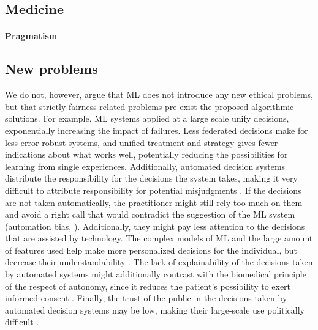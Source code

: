 \subsection{Medicine}

    \paragraph{Pragmatism}


\subsection{New problems}
    We do not, however, argue that ML does not introduce any new ethical problems, but that strictly fairness-related problems pre-exist the proposed algorithmic solutions.
    For example, ML systems applied at a large scale unify decisions, exponentially increasing the impact of failures.
    Less federated decisions make for less error-robust systems, and unified treatment and strategy gives fewer indications about what works well, potentially reducing the possibilities for learning from single experiences.
    Additionally, automated decision systems distribute the responsibility for the decisions the system takes, making it very difficult to attribute responsibility for potential misjudgments \cite[p.~6]{Morley2020}.
    If the decisions are not taken automatically, the practitioner might still rely too much on them and avoid a right call that would contradict the suggestion of the ML system \cite[p.~4]{Morley2020} (automation bias, \cite[p.~4]{Rajkomar2018}).
    Additionally, they might pay less attention to the decisions that are assisted by technology.
    The complex models of ML and the large amount of features used help make more personalized decisions for the individual, but decrease their understandability \cite[p.~4]{Rajkomar2018}.
    The lack of explainability of the decisions taken by automated systems might additionally contrast with the biomedical principle of the respect of autonomy, since it reduces the patient's possibility to exert informed consent \cite[p.~346]{Dijkstra2020}.
    Finally, the trust of the public in the decisions taken by automated decision systems may be low, making their large-scale use politically difficult \cite[p.~4]{Morley2020}.
